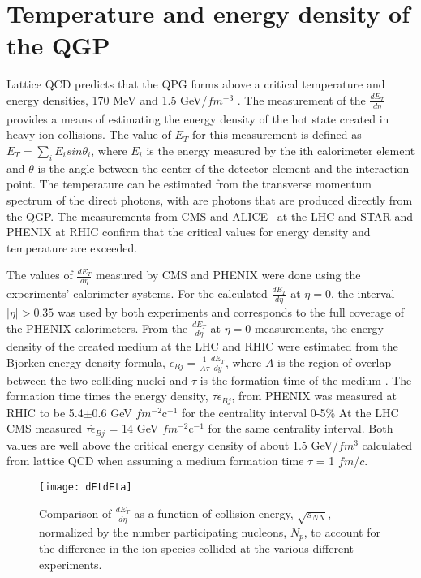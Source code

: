   \section{Temperature and energy density of the QGP}
    Lattice QCD predicts that the QPG forms above a critical temperature and 
      energy densities, 170 MeV and 1.5 GeV/$fm$$^{-3}$ \cite{}.
    The measurement of the $\frac{dE_{T}}{d\eta}$ provides a means of 
      estimating the energy density of the hot state created in heavy-ion
      collisions. 
    The value of $E_{T}$ for this measurement is defined as 
      $E_{T}=\sum_{i}E_{i}sin\theta_{i}$, where $E_{i}$ is the energy measured 
      by the ith calorimeter element and $\theta$ is the angle between the 
      center of the detector element and the interaction point. 
    The temperature can be estimated from the transverse momentum 
      spectrum of the direct photons, with are photons that are produced 
      directly from the QGP.
    The measurements from CMS and ALICE~\cite{Aamodt:2008zz} at the LHC and STAR and PHENIX at RHIC
      confirm that the critical values for energy density and temperature are
      exceeded.

    The values of $\frac{dE_{T}}{d\eta}$ measured by CMS \cite{cmsEt} and PHENIX 
      \cite{phenixDeDeta} were done using the experiments' calorimeter 
      systems.
    For the calculated $\frac{dE_{T}}{d\eta}$ at $\eta = 0$, the interval 
      $|\eta| > 0.35$ was used by both experiments and corresponds to the full
      coverage of the PHENIX calorimeters. 
    From the $\frac{dE_{T}}{d\eta}$ at $\eta = 0$ measurements, the energy 
      density of the created medium at the LHC and RHIC were estimated from the
      Bjorken energy density formula, 
    $\epsilon_{Bj}=\frac{1}{A\tau}\frac{dE_{T}}{dy}$, where $A$ is the region
      of overlap between the two colliding nuclei and $\tau$ is the formation
      time of the medium \cite{bjEdense}.
    The formation time times the energy density, $\tau\dot\epsilon_{Bj}$, 
      from PHENIX was measured at RHIC to be 5.4$\pm$0.6 GeV $fm$$^{-2}$c$^{-1}$ 
      for the centrality interval 0-5\% 
    At the LHC CMS measured $\tau\dot\epsilon_{Bj}$ = 14 GeV $fm$$^{-2}$c$^{-1}$ 
      for the same centrality interval.
    Both values are well above the critical energy density of about 1.5 GeV/$fm$$^{3}$ 
      calculated from lattice QCD when assuming a medium formation time $\tau$ 
      = 1 $fm$/$c$.
      \begin{figure}[!Hhbt]
        \centering
        \texttt{[image: dEtdEta]}
        \caption{Comparison of $\frac{dE_{T}}{d\eta}$ as a function of 
          collision energy, $\sqrt{s_{NN}}$, normalized by the number 
          participating nucleons, $N_{p}$, to account for the difference in 
          the ion species collided at the various different experiments.}
        \label{fig:dEtdEta}
      \end{figure}

